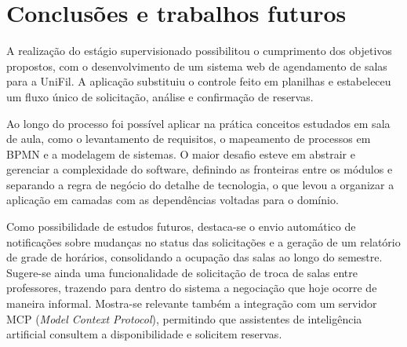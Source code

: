 \chapter{Conclusões e trabalhos futuros}\label{sec:conclusoes}

A realização do estágio supervisionado possibilitou o cumprimento dos objetivos propostos,
com o desenvolvimento de um sistema web de agendamento de salas para a UniFil.
A aplicação substituiu o controle feito em planilhas e estabeleceu um fluxo único
de solicitação, análise e confirmação de reservas.

Ao longo do processo foi possível aplicar na prática conceitos estudados em sala de aula,
como o levantamento de requisitos, o mapeamento de processos em BPMN e a modelagem de sistemas.
O maior desafio esteve em abstrair e gerenciar a complexidade do software,
definindo as fronteiras entre os módulos e separando a regra de negócio
do detalhe de tecnologia, o que levou a organizar a aplicação em camadas
com as dependências voltadas para o domínio.

Como possibilidade de estudos futuros, destaca-se o envio automático de notificações
sobre mudanças no status das solicitações e a geração de um relatório de grade de horários,
consolidando a ocupação das salas ao longo do semestre.
Sugere-se ainda uma funcionalidade de solicitação de troca de salas entre professores,
trazendo para dentro do sistema a negociação que hoje ocorre de maneira informal.
Mostra-se relevante também a integração com um servidor MCP (\textit{Model Context Protocol}),
permitindo que assistentes de inteligência artificial consultem a disponibilidade
e solicitem reservas.
